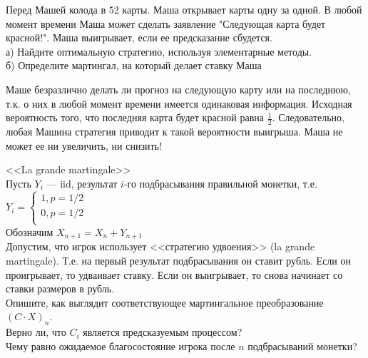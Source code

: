\begin{solution}
\begin{solution}
\begin{solution}
\begin{solution}
\begin{solution}
\begin{solution}
\begin{solution}
\begin{solution}
\begin{solution}
{\begin{solution}
\end{solution}

\begin{problem}
Перед Машей колода в 52 карты. Маша открывает карты одну за одной.
В любой момент времени Маша может сделать заявление "Следующая
карта будет красной!". Маша выигрывает, если ее
предсказание сбудется. \\
а) Найдите оптимальную стратегию, используя элементарные методы. \\
б) Определите мартингал, на который делает ставку Маша 
\end{problem} 
\begin{solution} 

Маше безразлично делать ли прогноз на следующую карту или на
последнюю, т.к. о них в любой момент времени имеется одинаковая
информация. Исходная вероятность того, что последняя карта будет
красной равна $\frac{1}{2}$. Следовательно, любая Машина стратегия
приводит к такой вероятности выигрыша. Маша не может ее ни
увеличить, ни снизить! 
\end{solution}

\begin{problem}
 <<La grande martingale>> \\
Пусть $Y_{i}$ --- iid, результат $i$-го подбрасывания правильной
монетки, т.е. $ Y_{i}= 
\begin{cases}
1, p=1/2 \\
0, p=1/2 \\
\end{cases}$ \\
Обозначим $X_{n+1}=X_{n}+Y_{n+1}$ \\
Допустим, что игрок использует <<стратегию удвоения>> (la grande
martingale). Т.е. на первый результат подбрасывания он ставит
рубль. Если он проигрывает, то удваивает ставку. Если он
выигрывает, то снова начинает со ставки размеров в рубль. \\
Опишите, как выглядит соответствующее мартингальное преобразование
$(C\cdot X)_{n}$. \\
Верно ли, что $C_{i}$ является предсказуемым процессом? \\
Чему равно ожидаемое благосостояние игрока после $n$ подбрасываний
монетки? 
\end{problem} 
\begin{solution} 

\end{solution}

}
\end{solution}
\end{solution}
\end{solution}
\end{solution}
\end{solution}
\end{solution}
\end{solution}
\end{solution}
\end{solution}
